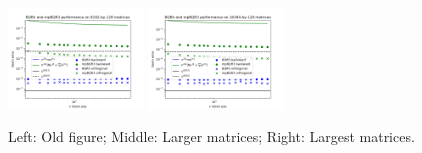 \documentclass[final,onefignum,onetabnum]{siamart190516}
\begin{document}
\begin{enumerate}
\begin{figure}[h!]
        \includegraphics[width=0.32\textwidth]{./figures/13-07.png}
        \includegraphics[width=0.32\textwidth]{./figures/14-07.png}
        \caption{\label{fig:Fig2} Left: Old figure; Middle: Larger matrices; Right: Largest matrices.}
        \vspace{-10pt}
    \end{figure} 
\end{enumerate}
\end{document}
